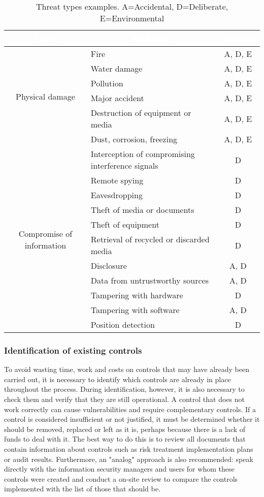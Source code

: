 \begin{table}[H]
\centering
\begin{tabularx}{\textwidth}{|c|X|c|} 
\hline
{\cellcolor{dummy-cyan}}\textbf{\textcolor{white}{TYPE}} & 
\multicolumn{1}{|c|}{{\cellcolor{dummy-cyan}}\textbf{\textcolor{white}{THREAT}}} &
{\cellcolor{dummy-cyan}}\textbf{\textcolor{white}{ORIGIN}}
\\ 
\hline
\multirow{6}{*}{Physical damage} & Fire & A, D, E\\
\cline{2-3} & Water damage & A, D, E\\
\cline{2-3} & Pollution & A, D, E\\
\cline{2-3} & Major accident & A, D, E\\
\cline{2-3} & Destruction of equipment or media & A, D, E\\
\cline{2-3} & Dust, corrosion, freezing & A, D, E\\
\hline
\multirow{11}{*}{Compromise of information} & Interception of compromising interference signals & D\\
\cline{2-3} & Remote spying & D\\
\cline{2-3} & Eavesdropping & D\\
\cline{2-3} & Theft of media or documents & D\\
\cline{2-3} & Theft of equipment & D\\
\cline{2-3} & Retrieval of recycled or discarded media & D\\
\cline{2-3} & Disclosure  & A, D\\
\cline{2-3} & Data from untrustworthy sources & A, D\\
\cline{2-3} & Tampering with hardware & D\\
\cline{2-3} & Tampering with software  & A, D\\
\cline{2-3} & Position detection  & D\\
\hline
\end{tabularx}
\caption{Threat types examples. A=Accidental, D=Deliberate, E=Environmental}
\end{table}\noindent
\subsubsection{Identification of existing controls}
To avoid wasting time, work and costs on controls that may have already been carried out, it is necessary to identify which controls are already in place throughout the process. During identification, however, it is also necessary to check them and verify that they are still operational. A control that does not work correctly can cause vulnerabilities and require complementary controls. If a control is considered insufficient or not justified, it must be determined whether it should be removed, replaced or left as it is, perhaps because there is a lack of funds to deal with it. The best way to do this is to review all documents that contain information about controls such as risk treatment implementation plans or audit results. Furthermore, an "analog" approach is also recommended: speak directly with the information security managers and users for whom these controls were created and conduct a on-site review to compare the controls implemented with the list of those that should be.
